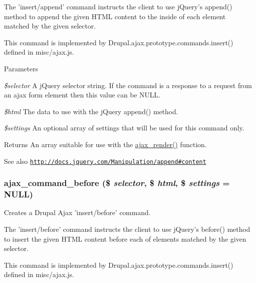 The 'insert/append' command instructs the client to use jQuery's append() method to append the given HTML content to the inside of each element matched by the given selector.

This command is implemented by Drupal.ajax.prototype.commands.insert() defined in misc/ajax.js.


\begin{DoxyParams}{Parameters}
\item[{\em \$selector}]A jQuery selector string. If the command is a response to a request from an ajax form element then this value can be NULL. \item[{\em \$html}]The data to use with the jQuery append() method. \item[{\em \$settings}]An optional array of settings that will be used for this command only.\end{DoxyParams}
\begin{DoxyReturn}{Returns}
An array suitable for use with the \hyperlink{group__ajax_ga241c2426bdde049c55b05b7bf5d714a2}{ajax\_\-render()} function.
\end{DoxyReturn}
\begin{DoxySeeAlso}{See also}
\href{http://docs.jquery.com/Manipulation/append#content}{\tt http://docs.jquery.com/Manipulation/append\#content} 
\end{DoxySeeAlso}
\hypertarget{group__ajax__commands_gafb261431270ce894d69e58a051ee9ead}{
\subsubsection[{ajax\_\-command\_\-before}]{\setlength{\rightskip}{0pt plus 5cm}ajax\_\-command\_\-before (\$ {\em selector}, \/  \$ {\em html}, \/  \$ {\em settings} = {\ttfamily NULL})}}
\label{group__ajax__commands_gafb261431270ce894d69e58a051ee9ead}
Creates a Drupal Ajax 'insert/before' command.

The 'insert/before' command instructs the client to use jQuery's before() method to insert the given HTML content before each of elements matched by the given selector.

This command is implemented by Drupal.ajax.prototype.commands.insert() defined in misc/ajax.js.


